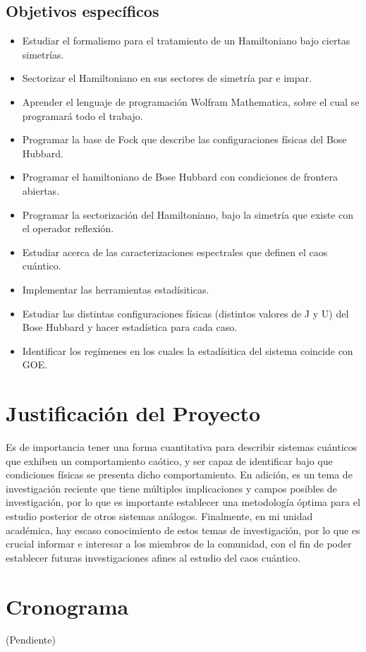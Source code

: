 \documentclass[spanish,titlepage,table]{practicas}
\begin{document}
\subsection{Objetivos específicos}
\begin{itemize}
\item Estudiar el formalismo para el tratamiento de un Hamiltoniano bajo ciertas simetrías.
\item Sectorizar el Hamiltoniano en sus sectores de simetría par e impar.
\item Aprender el lenguaje de programación Wolfram Mathematica, sobre el cual se programará todo el trabajo.
\item Programar la base de Fock que describe las configuraciones físicas del Bose Hubbard.
\item Programar el hamiltoniano de Bose Hubbard con condiciones de frontera abiertas.
\item Programar la sectorización del Hamiltoniano, bajo la simetría que existe con el operador reflexión.
\item Estudiar acerca de las caracterizaciones espectrales que definen el caos cuántico.
\item Implementar las herramientas estadísiticas.
\item Estudiar las distintas configuraciones físicas (distintos valores de J y U) del Bose Hubbard y hacer estadística para cada caso.
\item Identificar los regímenes en los cuales la estadísitica del sistema coincide con GOE.
\end{itemize}
\section{Justificación del Proyecto}
Es de importancia tener una forma cuantitativa para describir sistemas cuánticos que exhiben 
un comportamiento caótico, y ser capaz de identificar bajo que condiciones físicas se presenta 
dicho comportamiento. En adición, es un tema de investigación reciente que tiene múltiples implicaciones 
y campos posibles de investigación, por lo que es importante establecer una metodología óptima para el estudio posterior de otros sistemas análogos.
Finalmente, en mi unidad académica, hay escaso conocimiento de estos temas de investigación, por lo que 
es crucial informar e interesar a los miembros de la comunidad, con el fin de poder establecer 
futuras investigaciones afines al estudio del caos cuántico.
\section{Cronograma}
(Pendiente)
\end{document}
